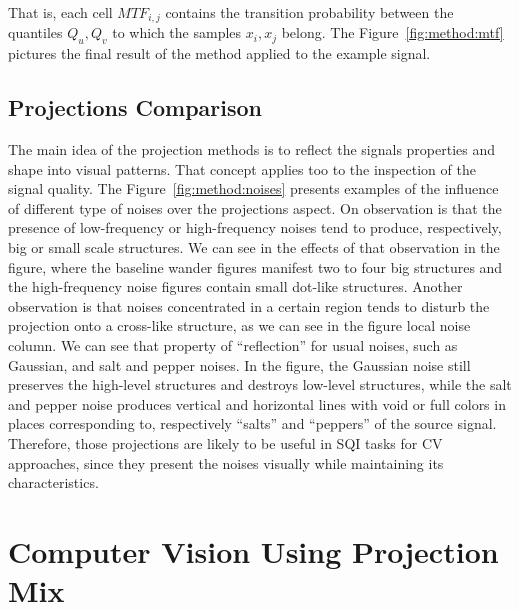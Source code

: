 \noindent That is, each cell $MTF_{i,j}$ contains the transition probability between the quantiles $Q_u,Q_v$ to which the samples $x_i,x_j$ belong. The Figure~\ref{fig:method:mtf} pictures the final result of the method applied to the example signal. 



\subsection{Projections Comparison}

The main idea of the projection methods is to reflect the signals properties and shape into visual patterns. That concept applies too to the inspection of the signal quality. The Figure~\ref{fig:method:noises} presents examples of the influence of different type of noises over the projections aspect. On observation is that the presence of low-frequency or high-frequency noises tend to produce, respectively, big or small scale structures. We can see in the effects of that observation in the figure, where the baseline wander figures manifest two to four big structures and the high-frequency noise figures contain small dot-like structures. Another observation is that noises concentrated in a certain region tends to disturb the projection onto a cross-like structure, as we can see in the figure local noise column. We can see that property of ``reflection'' for usual noises, such as Gaussian, and salt and pepper noises. In the figure, the Gaussian noise still preserves the high-level structures and destroys low-level structures, while the salt and pepper noise produces vertical and horizontal lines with void or full colors in places corresponding to, respectively ``salts'' and ``peppers'' of the source signal. Therefore, those projections are likely to be useful in \gls{SQI} tasks for \gls{CV} approaches, since they present the noises visually while maintaining its characteristics.  



\section{Computer Vision Using Projection Mix}

